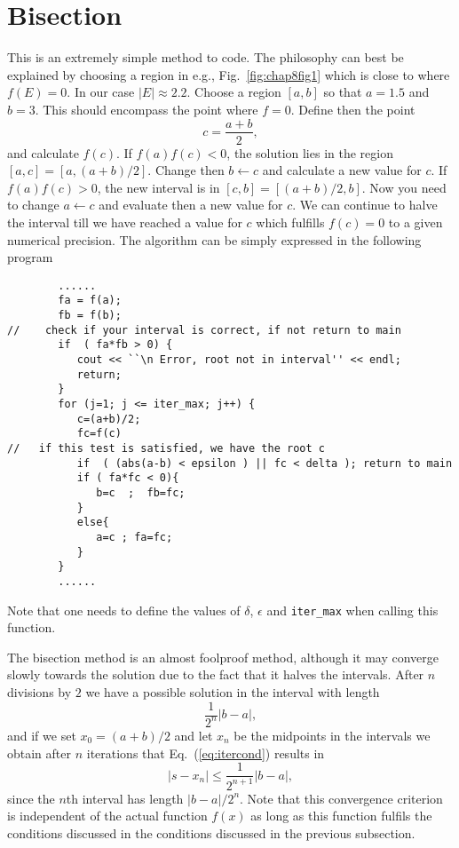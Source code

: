 \section{Bisection} \label{sec:bisec}

This is an extremely simple method to code. The philosophy can best be  explained
by choosing a region in e.g., Fig.\ \ref{fig:chap8fig1} which is close to where $f(E)=0$.
In our case $|E|\approx 2.2$. Choose a region $[a,b]$ so that $a=1.5$ and $b=3$.
This should encompass the point where $f=0$. 
Define then the point 
\[
 c=\frac{a+b}{2},
\]
and calculate $f(c)$. If $f(a)f(c) < 0$, the solution lies in the region $[a,c]=[a,(a+b)/2]$. 
Change then $b\leftarrow c$ and calculate a new value for $c$. 
If $f(a)f(c) >  0$, the new interval is in $[c,b]=[(a+b)/2,b]$. Now you need to change 
$a\leftarrow c$ and evaluate then a new value for $c$. We can continue to halve
the interval till we have reached a value for $c$ which fulfills $f(c)=0$
to a given numerical precision. The algorithm can be simply expressed in the following program
\lstset{language=c++}
\begin{lstlisting}
        ......
        fa = f(a);
        fb = f(b);
//    check if your interval is correct, if not return to main 
        if  ( fa*fb > 0) { 
           cout << ``\n Error, root not in interval'' << endl; 
           return; 
        }
        for (j=1; j <= iter_max; j++) {
           c=(a+b)/2;
           fc=f(c)
//   if this test is satisfied, we have the root c
           if  ( (abs(a-b) < epsilon ) || fc < delta ); return to main 
           if ( fa*fc < 0){
              b=c  ;  fb=fc;
           }
           else{
              a=c ; fa=fc;
           }
        }
        ......
\end{lstlisting}
Note that one needs to define the values of $\delta$, $\epsilon$ and
\verb$iter_max$ when calling
this function.

The bisection method is an almost foolproof method, although it may converge
slowly towards the solution due to the fact that it halves the intervals.
After $n$ divisions by $2$ we have a possible solution in the interval
with length 
\[
   \frac{1}{2^n}\left|b-a\right|,
\]
and if we set $x_0=(a+b)/2$ and let $x_n$ be the midpoints in the intervals
we obtain after $n$ iterations that Eq.\ (\ref{eq:itercond}) results in
\begin{equation}
    \left|s-x_n\right| \le \frac{1}{2^{n+1}}\left|b-a\right|,
     \label{eq:bisectest}
\end{equation}     
since the $n$th interval has length $|b-a|/2^n$.
Note that this convergence criterion is independent of the 
actual function $f(x)$ as long as this function fulfils the conditions
discussed in the conditions discussed in the previous subsection. 

